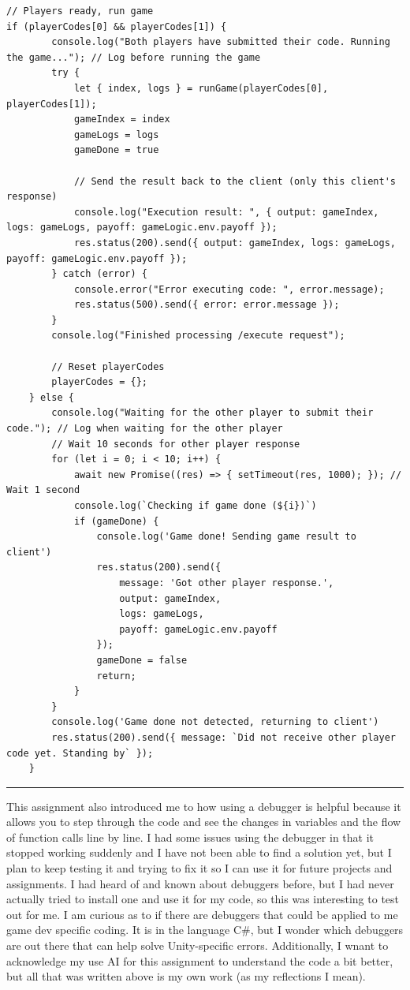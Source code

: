 \documentclass{article}
\theoremstyle{theorem}
\theoremstyle{definition}
\theoremstyle{remark}
\begin{document}
\begin{verbatim}
// Players ready, run game
if (playerCodes[0] && playerCodes[1]) {
        console.log("Both players have submitted their code. Running the game..."); // Log before running the game
        try {
            let { index, logs } = runGame(playerCodes[0], playerCodes[1]);
            gameIndex = index
            gameLogs = logs
            gameDone = true

            // Send the result back to the client (only this client's response)
            console.log("Execution result: ", { output: gameIndex, logs: gameLogs, payoff: gameLogic.env.payoff });
            res.status(200).send({ output: gameIndex, logs: gameLogs, payoff: gameLogic.env.payoff });
        } catch (error) {
            console.error("Error executing code: ", error.message);
            res.status(500).send({ error: error.message });
        }
        console.log("Finished processing /execute request");

        // Reset playerCodes
        playerCodes = {};
    } else {
        console.log("Waiting for the other player to submit their code."); // Log when waiting for the other player
        // Wait 10 seconds for other player response
        for (let i = 0; i < 10; i++) {
            await new Promise((res) => { setTimeout(res, 1000); }); // Wait 1 second
            console.log(`Checking if game done (${i})`)
            if (gameDone) {
                console.log('Game done! Sending game result to client')
                res.status(200).send({
                    message: 'Got other player response.',
                    output: gameIndex,
                    logs: gameLogs,
                    payoff: gameLogic.env.payoff
                });
                gameDone = false
                return;
            }
        }
        console.log('Game done not detected, returning to client')
        res.status(200).send({ message: `Did not receive other player code yet. Standing by` });
    }
\end{verbatim}

\noindent
{\color{gray} \rule{\linewidth}{0.05mm}}



This assignment also introduced me to how using a debugger is helpful because it allows you to step through the code and see the changes in variables and the flow of function calls line by line. I had some issues using the debugger in that it stopped working suddenly and I have not been able to find a solution yet, but I plan to keep 
testing it and trying to fix it so I can use it for future projects and assignments. I had heard of and known about debuggers before, but I had never actually tried to install one and use it for my code, so this was interesting to test out for me. I am curious as to if there are debuggers that could be applied to me game dev specific coding.
It is in the language C\#, but I wonder which debuggers are out there that can help solve Unity-specific errors. Additionally, I wnant to acknowledge my use AI for this assignment to understand the code a bit better, but all that was written above is my own work (as my reflections I mean). 
\end{document}

